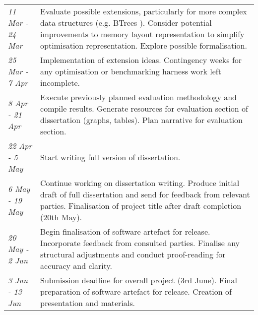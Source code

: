 \documentclass[11pt]{article}
\begin{document}
\begin{longtable}{p{}p{}}
  \textsl{11 Mar - 24 Mar} & Evaluate possible extensions, particularly for more complex data structures (e.g. BTrees \cite{btrees}). Consider potential improvements to memory layout representation to simplify optimisation representation. Explore possible formalisation.\\

  \textsl{25 Mar - 7 Apr} & Implementation of extension ideas. Contingency weeks for any optimisation or benchmarking harness work left incomplete.\\

  \textsl{8 Apr - 21 Apr} & Execute previously planned evaluation methodology and compile results. Generate resources for evaluation section of dissertation (graphs, tables). Plan narrative for evaluation section.\\

  \textsl{22 Apr - 5 May} & Start writing full version of dissertation.\\

  \textsl{6 May - 19 May} & Continue working on dissertation writing. Produce initial draft of full dissertation and send for feedback from relevant parties. Finalisation of project title after draft completion (20th May).\\

  \textsl{20 May - 2 Jun} & Begin finalisation of software artefact for release. Incorporate feedback from consulted parties. Finalise any structural adjustments and conduct proof-reading for accuracy and clarity.\\

  \textsl{3 Jun - 13 Jun} & Submission deadline for overall project (3rd June). Final preparation of software artefact for release. Creation of presentation and materials.\\

  \bottomrule
\end{longtable}



\end{document}
